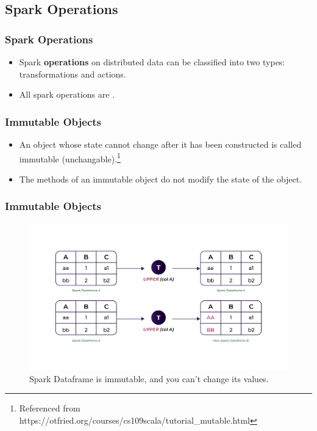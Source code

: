 %
\subsection{Spark Operations}\label{subsec:spark-operations}
\begin{frame}
    \frametitle{Spark Operations}
    \begin{itemize}
        \item Spark \textbf{operations} on distributed data can be classified into two types: transformations
        and actions.
        \item All spark operations are \texttt{\color{blue}{immutable}}.
    \end{itemize}
\end{frame}
\begin{frame}
    \frametitle{Immutable Objects}
    \begin{itemize}
        \item An object whose state cannot change after it has been constructed is
        called immutable (unchangable).\footnote{Referenced from https://otfried.org/courses/cs109scala/tutorial_mutable.html}
        \item  The methods of an immutable object do not modify the state of the object.
    \end{itemize}
\end{frame}

\begin{frame}
    \frametitle{Immutable Objects}
    \begin{figure}
        \includegraphics[width=\textwidth,height=.7\textheight,keepaspectratio]{./Figures/chapter-04/Immutable_df}
        \caption{Spark Dataframe is immutable, and you can't change its values.}\label{fig:Immutable_df}
    \end{figure}
\end{frame}

